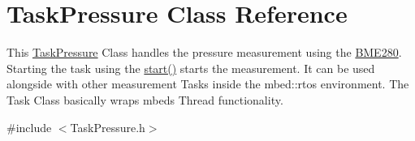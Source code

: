 \hypertarget{class_task_pressure}{}\section{Task\+Pressure Class Reference}
\label{class_task_pressure}


This \hyperlink{class_task_pressure}{Task\+Pressure} Class handles the pressure measurement using the \hyperlink{class_b_m_e280}{B\+M\+E280}. Starting the task using the \hyperlink{class_task_pressure_a702e7f98f983c27a8cc70b4f7d11fbda}{start()} starts the measurement. It can be used alongside with other measurement Tasks inside the mbed\+::rtos environment. The Task Class basically wraps mbeds Thread functionality.  




{\ttfamily \#include $<$Task\+Pressure.\+h$>$}

